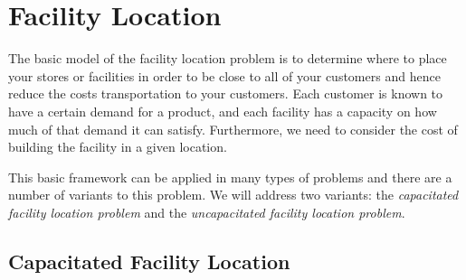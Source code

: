 \section{Facility Location}
\todoSection{}
The basic model of the facility location problem is to determine where to place your stores or facilities in order to be close to all of your customers and hence reduce the costs transportation to your customers.  Each customer is known to have a certain demand for a product, and each facility has a capacity on how much of that demand it can satisfy.  Furthermore, we need to consider the cost of building the facility in a given location.

This basic framework can be applied in many types of problems and there are a number of variants to this problem.   We will address two variants: the \emph{capacitated facility location problem} and the \emph{uncapacitated facility location problem}.  



\subsection{Capacitated Facility Location}


